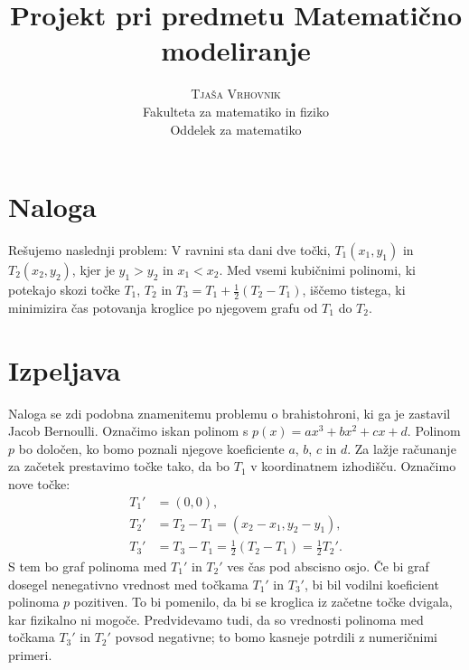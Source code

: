 \documentclass[a4paper]{article}
\begin{document}
\title{\Huge\textbf{Projekt pri predmetu Matematično modeliranje}} 
\author{\large\textsc{Tjaša Vrhovnik}\\
	Fakulteta za matematiko in fiziko\\
	Oddelek za matematiko}

\thispagestyle{empty}

\maketitle

\newpage


\section{Naloga}

Rešujemo naslednji problem: V ravnini sta dani dve točki, $T_{1}(x_1,y_1)$ in $T_{2}(x_2,y_2)$, kjer je $y_1 > y_2$ in $x_1 < x_2$. Med vsemi kubičnimi polinomi, ki potekajo skozi točke $T_1$, $T_2$ in $T_3 = T_1 + \frac{1}{2} (T_2-T_1)$, iščemo tistega, ki minimizira čas potovanja kroglice po njegovem grafu od $T_1$ do $T_2$.

\section{Izpeljava}

Naloga se zdi podobna znamenitemu problemu o brahistohroni, ki ga je zastavil Jacob Bernoulli.
Označimo iskan polinom s $p(x) = ax^3+bx^2+cx+d$. Polinom $p$ bo določen, ko bomo poznali njegove koeficiente $a$, $b$, $c$ in $d$.
Za lažje računanje za začetek prestavimo točke tako, da bo $T_1$ v koordinatnem izhodišču. Označimo nove točke:
\begin{align*}
T_{1}' &= (0,0), \\
T_{2}' &= T_2 - T_1 = (x_2-x_1, y_2-y_1), \\
T_{3}' &= T_3 - T_1 = \frac{1}{2}(T_2 - T_1) = \frac{1}{2}T_{2}'.
\end{align*}
S tem bo graf polinoma med $T_{1}'$ in $T_{2}'$ ves čas pod abscisno osjo. Če bi graf dosegel nenegativno vrednost med točkama $T_{1}'$ in $T_{3}'$, bi bil vodilni koeficient polinoma $p$ pozitiven. To bi pomenilo, da bi se kroglica iz začetne točke dvigala, kar fizikalno ni mogoče. Predvidevamo tudi, da so vrednosti polinoma med točkama $T_{3}'$ in $T_{2}'$ povsod negativne; to bomo kasneje potrdili z numeričnimi primeri.
\end{document}
